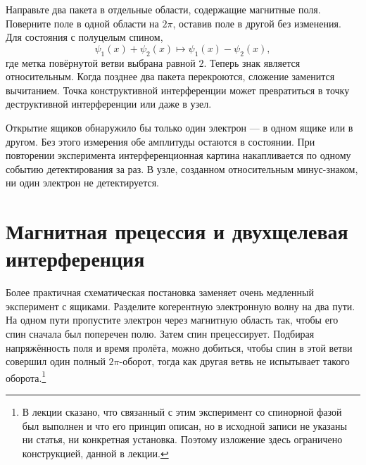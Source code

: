 Направьте два пакета в отдельные области, содержащие магнитные поля. Поверните поле в одной области на \(2\pi\), оставив поле в другой без изменения. Для состояния с полуцелым спином,
\begin{equation}
\psi_1(x)+\psi_2(x)
\longmapsto
\psi_1(x)-\psi_2(x),
\end{equation}
где метка повёрнутой ветви выбрана равной \(2\). Теперь знак является относительным. Когда позднее два пакета перекроются, сложение заменится вычитанием. Точка конструктивной интерференции может превратиться в точку деструктивной интерференции или даже в узел.

\begin{classroomqa}
\end{classroomqa}

Открытие ящиков обнаружило бы только один электрон — в одном ящике или в другом. Без этого измерения обе амплитуды остаются в состоянии. При повторении эксперимента интерференционная картина накапливается по одному событию детектирования за раз. В узле, созданном относительным минус-знаком, ни один электрон не детектируется.

\section{Магнитная прецессия и двухщелевая интерференция}

Более практичная схематическая постановка заменяет очень медленный эксперимент с ящиками. Разделите когерентную электронную волну на два пути. На одном пути пропустите электрон через магнитную область так, чтобы его спин сначала был поперечен полю. Затем спин прецессирует. Подбирая напряжённость поля и время пролёта, можно добиться, чтобы спин в этой ветви совершил один полный \(2\pi\)-оборот, тогда как другая ветвь не испытывает такого оборота.\footnote{В лекции сказано, что связанный с этим эксперимент со спинорной фазой был выполнен и что его принцип описан, но в исходной записи не указаны ни статья, ни конкретная установка. Поэтому изложение здесь ограничено конструкцией, данной в лекции.}

\begin{classroomqa}
\end{classroomqa}

